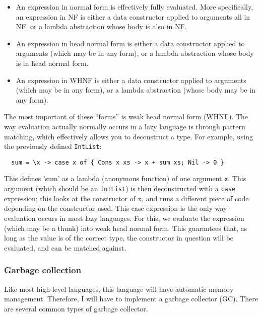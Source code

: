 \documentclass[9pt]{extarticle}
\begin{document}
\begin{itemize}

  \item An expression in normal form is effectively fully evaluated. More
  specifically, an expression in NF is either a data constructor applied to
  arguments all in NF, or a lambda abstraction whose body is also in NF.

  \item An expression in head normal form is either a data constructor applied to
  arguments (which may be in any form), or a lambda abstraction whose body is
  in head normal form.

  \item An expression in WHNF is either a data constructor applied to arguments
  (which may be in any form), or a lambda abstraction (whose body may be in
  any form).

\end{itemize}

The most important of these ``forms'' is weak head normal form (WHNF).
The way evaluation actually normally occurs in a lazy language is
through pattern matching, which effectively allows you to deconstruct a
type. For example, using the previously defined \verb'IntList':

\begin{verbatim}
  sum = \x -> case x of { Cons x xs -> x + sum xs; Nil -> 0 }
\end{verbatim}

This defines 'sum' as a lambda (anonymous function) of one argument
\verb'x'.  This argument (which should be an \verb'IntList') is then
deconstructed with a \verb'case' expression; this looks at the
constructor of x, and runs a different piece of code depending on the
constructor used. This case expression is the only way evaluation occurs
in most lazy languages. For this, we evaluate the expression (which may
be a thunk) into weak head normal form. This guarantees that, as long as
the value is of the correct type, the constructor in question will be
evaluated, and can be matched against.

\subsubsection{Garbage collection}

Like most high-level languages, this language will have automatic memory
management. Therefore, I will have to implement a garbage collector
(GC). There are several common types of garbage collector.
\end{document}
